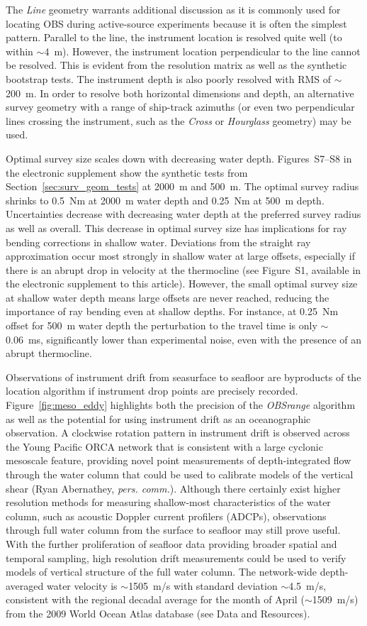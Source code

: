 The \textit{Line} geometry warrants additional discussion as it is commonly used for locating OBS during active-source experiments because it is often the simplest pattern. Parallel to the line, the instrument location is resolved quite well (to within $\sim$4~m). However, the instrument location perpendicular to the line cannot be resolved. This is evident from the resolution matrix as well as the synthetic bootstrap tests. The instrument depth is also poorly resolved with RMS of $\sim$200~m. In order to resolve both horizontal dimensions and depth, an alternative survey geometry with a range of ship-track azimuths (or even two perpendicular lines crossing the instrument, such as the \textit{Cross} or \textit{Hourglass} geometry) may be used.

Optimal survey size scales down with decreasing water depth. Figures~S7--S8 in the electronic supplement show the synthetic tests from Section~\ref{sec:surv_geom_tests} at 2000~m and 500~m. The optimal survey radius shrinks to 0.5~Nm at 2000~m water depth and 0.25~Nm at 500~m depth. Uncertainties decrease with decreasing water depth at the preferred survey radius as well as overall. This decrease in optimal survey size has implications for ray bending corrections in shallow water. Deviations from the straight ray approximation occur most strongly in shallow water at large offsets, especially if there is an abrupt drop in velocity at the thermocline (see Figure~S1, available in the electronic supplement to this article). However, the small optimal survey size at shallow water depth means large offsets are never reached, reducing the importance of ray bending even at shallow depths. For instance, at 0.25~Nm offset for 500~m water depth the perturbation to the travel time is only $\sim$0.06~ms, significantly lower than experimental noise, even with the presence of an abrupt thermocline.

Observations of instrument drift from seasurface to seafloor are byproducts of the location algorithm if instrument drop points are precisely recorded. Figure~\ref{fig:meso_eddy} highlights both the precision of the \textit{OBSrange} algorithm as well as the potential for using instrument drift as an oceanographic observation. A clockwise rotation pattern in instrument drift is observed across the Young Pacific ORCA network that is consistent with a large cyclonic mesoscale feature, providing novel point measurements of depth-integrated flow through the water column that could be used to calibrate models of the vertical shear (Ryan Abernathey, \textit{pers. comm.}). Although there certainly exist higher resolution methods for measuring shallow-most characteristics of the water column, such as acoustic Doppler current profilers (ADCPs), observations through full water column from the surface to seafloor may still prove useful. With the further proliferation of seafloor data providing broader spatial and temporal sampling, high resolution drift measurements could be used to verify models of vertical structure of the full water column. The network-wide depth-averaged water velocity is $\sim$1505~m/s with standard deviation $\sim$4.5~m/s, consistent with the regional decadal average for the month of April ($\sim$1509~m/s) from the 2009 World Ocean Atlas database (see Data and Resources).

